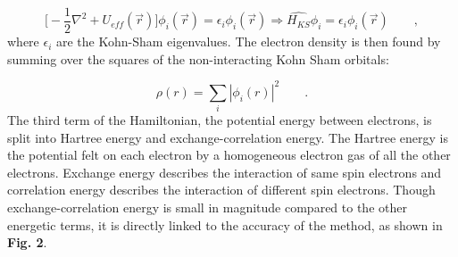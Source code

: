 \documentclass[3p,review,12pt]{elsarticle}
\begin{document}
 \begin{equation}
 \bigg[-\frac{1}{2}\nabla^{2}+U_{eff}(\vec{r})\bigg]\phi_{i}(\vec{r}) = \epsilon_{i}\phi_{i}(\vec{r}) \Rightarrow \hat{H_{KS}}\phi_{i} = \epsilon_{i}\phi_{i}(\vec{r}) \qquad ,
 \end{equation}
where $\epsilon_{i}$ are the Kohn-Sham eigenvalues. The electron density is then found by summing over the squares of the non-interacting Kohn Sham orbitals:

\begin{equation}
\rho (r) = \sum_{i}|\phi _{i}(r)|^{2} \qquad.
\end{equation}
The third term of the Hamiltonian, the potential energy between electrons, is split into Hartree energy and exchange-correlation energy. The Hartree energy is  the potential felt on each electron by a homogeneous electron gas of all the other electrons. Exchange energy describes the interaction of same spin electrons and correlation energy describes the interaction of different spin electrons. Though exchange-correlation energy is small in magnitude compared to the other energetic terms, it is directly linked to the accuracy of the method, as shown in \textbf{Fig. 2}. 
\end{document}
